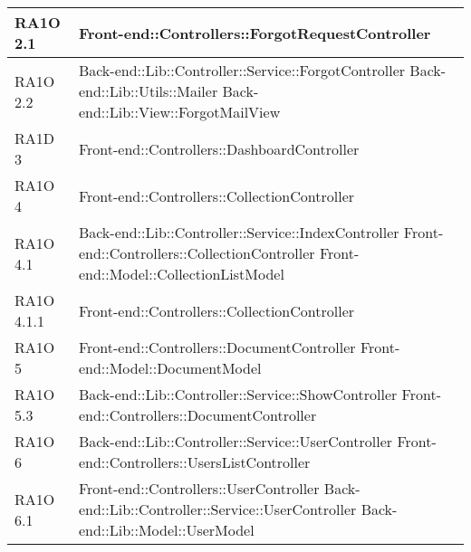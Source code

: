 \begin{center}
\begin{longtable}{ | p{3cm} | p{11cm} | }
    RA1O 2.1 & Front-end::Controllers::ForgotRequestController \newline  \\ \hline   
       
    RA1O 2.2 & Back-end::Lib::Controller::Service::ForgotController \newline
    			  			Back-end::Lib::Utils::Mailer \newline
    			  			Back-end::Lib::View::ForgotMailView \newline  \\ \hline     
    			   
     
    RA1D 3 & Front-end::Controllers::DashboardController \newline  \\ \hline  
        
    RA1O 4 & Front-end::Controllers::CollectionController \newline  \\ \hline   
       
    RA1O 4.1 & Back-end::Lib::Controller::Service::IndexController \newline Front-end::Controllers::CollectionController \newline Front-end::Model::CollectionListModel \newline  \\ \hline   
       
    RA1O 4.1.1 & Front-end::Controllers::CollectionController \newline  \\ \hline 
         
    RA1O 5 & Front-end::Controllers::DocumentController \newline
    			 Front-end::Model::DocumentModel \newline  \\ \hline    
           
    RA1O 5.3 & Back-end::Lib::Controller::Service::ShowController \newline
    			 Front-end::Controllers::DocumentController\newline  \\ \hline      
    
    RA1O 6 & Back-end::Lib::Controller::Service::UserController \newline Front-end::Controllers::UsersListController  \\ \hline  
        
    RA1O 6.1 & Front-end::Controllers::UserController \newline Back-end::Lib::Controller::Service::UserController \newline Back-end::Lib::Model::UserModel \\ \hline   
       

\end{longtable}
\end{center}
